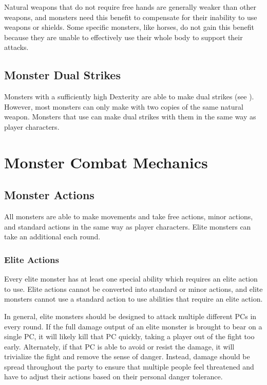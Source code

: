     Natural weapons that do not require free hands are generally weaker than other weapons, and monsters need this benefit to compensate for their inability to use weapons or shields.
    Some specific monsters, like horses, do not gain this benefit because they are unable to effectively use their whole body to support their attacks.

  \subsection{Monster Dual Strikes}\label{Monster Dual Strikes}
    Monsters with a sufficiently high Dexterity are able to make dual strikes (see ).
    However, most monsters can only make  with two copies of the same  natural weapon.
    Monsters that use  can make dual strikes with them in the same way as player characters.

\section{Monster Combat Mechanics}

  \subsection{Monster Actions}\label{Monster Actions}
    All monsters are able to make movements and take free actions, minor actions, and standard actions in the same way as player characters.
    Elite monsters can take an additional  each round.

    \subsubsection{Elite Actions}\label{Elite Actions}
      Every elite monster has at least one special ability which requires an elite action to use.
      Elite actions cannot be converted into standard or minor actions, and elite monsters cannot use a standard action to use abilities that require an elite action.

      In general, elite monsters should be designed to attack multiple different PCs in every round.
      If the full damage output of an elite monster is brought to bear on a single PC, it will likely kill that PC quickly, taking a player out of the fight too early.
      Alternately, if that PC is able to avoid or resist the damage, it will trivialize the fight and remove the sense of danger.
      Instead, damage should be spread throughout the party to ensure that multiple people feel threatened and have to adjust their actions based on their personal danger tolerance.

